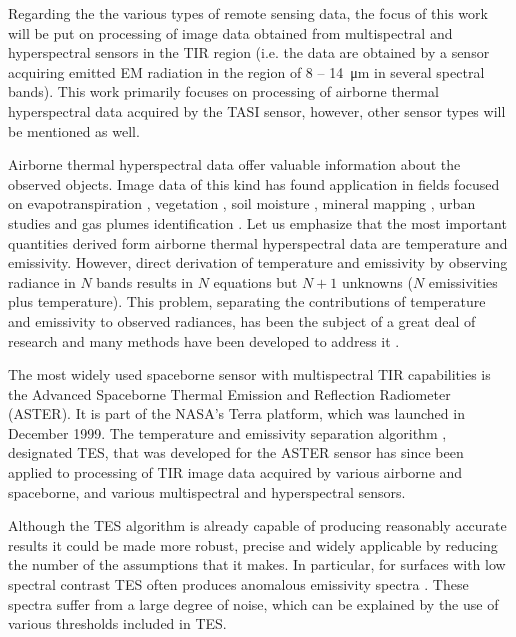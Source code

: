 Regarding the the various types of remote sensing data, the focus of this work will be put on processing of image data obtained from multispectral and hyperspectral sensors in the TIR region (i.e. the data are obtained by a sensor acquiring emitted EM radiation in the region of 8 – \SI{14}{\micro\meter} in several spectral bands). This work primarily focuses on processing of airborne thermal hyperspectral data acquired by the TASI sensor, however, other sensor types will be mentioned as well.

Airborne thermal hyperspectral data offer valuable information about the observed objects. Image data of this kind has found application in fields focused on evapotranspiration \cite{PP12}, vegetation \cite{RC10}, soil moisture \cite{SF12}, mineral mapping \cite{NK14}, urban studies \cite{SO12} and gas plumes identification \cite{PM05}. Let us emphasize that the most important quantities derived form airborne thermal hyperspectral data are temperature and emissivity. However, direct derivation of temperature and emissivity by observing radiance in $N$ bands results in $N$ equations but $N+1$ unknowns ($N$ emissivities plus temperature). This problem, separating the contributions of temperature and emissivity to observed radiances, has been the subject of a great deal of research and many methods have been developed to address it \cite{LT13}. 
 
The most widely used spaceborne sensor with multispectral TIR capabilities is the Advanced Spaceborne Thermal Emission and Reflection Radiometer (ASTER). It is part of the NASA's Terra platform, which was launched in December 1999. The temperature and emissivity separation algorithm \cite{GR98}, designated TES, that was developed for the ASTER sensor has since been applied to processing of TIR image data acquired by various airborne and spaceborne, and various multispectral and hyperspectral sensors.

Although the TES algorithm is already capable of producing reasonably accurate results it could be made more robust, precise and widely applicable by reducing the number of the assumptions that it makes. In particular, for surfaces with low spectral contrast TES often produces anomalous emissivity spectra \cite{CC07, SJ07}. These spectra suffer from a large degree of noise, which can be explained by the use of various thresholds included in TES. %


